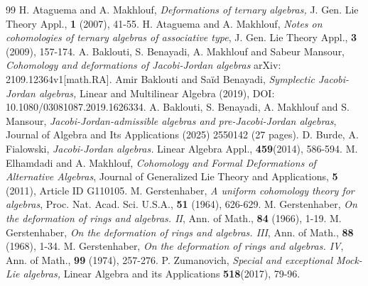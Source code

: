 \documentclass[12pt]{amsart}
\begin{document}
	\begin{thebibliography}{99}
		 H. Ataguema and A. Makhlouf, {\it Deformations of ternary algebras,} J. Gen. Lie Theory Appl., {\bf 1} (2007), 41-55.
		 H. Ataguema and A. Makhlouf, {\it Notes on cohomologies of ternary algebras of associative type}, J. Gen. Lie Theory Appl., {\bf 3} (2009),
		157-174.
		 A. Baklouti, S.  Benayadi, A. Makhlouf and Sabeur Mansour, {\it Cohomology and deformations of Jacobi-Jordan algebras} arXiv: 2109.12364v1[math.RA].
		 Amir Baklouti and Saïd Benayadi, {\it Symplectic Jacobi-Jordan algebras,} Linear and Multilinear Algebra (2019),  DOI: 10.1080/03081087.2019.1626334.
		 A. Baklouti, S. Benayadi, A. Makhlouf and S. Mansour, {\it Jacobi-Jordan-admissible algebras
			and pre-Jacobi-Jordan algebras}, Journal of Algebra and Its Applications
		(2025) 2550142 (27 pages).
		 D. Burde, A. Fialowski, {\it Jacobi-Jordan algebras.} Linear Algebra Appl., {\bf 459}(2014), 586-594.
		 M. Elhamdadi and A. Makhlouf, {\it Cohomology and Formal Deformations of Alternative Algebras}, Journal of Generalized Lie Theory and Applications, {\bf 5} (2011), Article ID G110105.
		 M. Gerstenhaber, {\it A uniform cohomology theory for algebras}, Proc. Nat. Acad. Sci. U.S.A., {\bf 51} (1964), 626-629.
		 M. Gerstenhaber, {\it On the deformation of rings and algebras. II}, Ann. of Math., {\bf 84} (1966), 1-19.
		 M. Gerstenhaber, {\it On the deformation of rings and algebras. III}, Ann. of Math., {\bf 88} (1968), 1-34.
		 M. Gerstenhaber, {\it On the deformation of rings and algebras. IV}, Ann. of Math., {\bf 99} (1974), 257-276.
		 P. Zumanovich, {\it Special and exceptional Mock-Lie algebras,} Linear Algebra and its Applications  {\bf 518}(2017), 79-96.
	\end{thebibliography}
\end{document}
